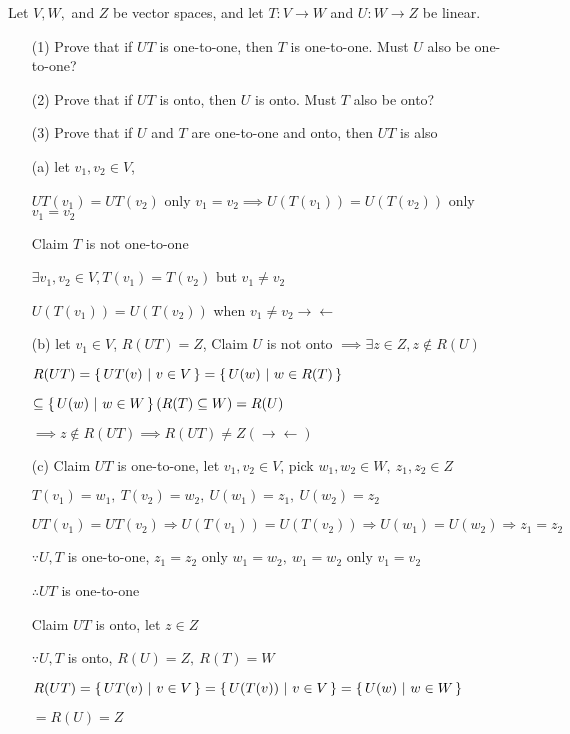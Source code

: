 Let $V,W,$ and $Z$ be vector spaces, and let $T:V \rightarrow W$ and $U:W \rightarrow Z$ be linear.

\begin{enumerate}
	\item[(1)] Prove that if $UT$ is one-to-one, then $T$ is one-to-one. Must $U$ also be one-to-one?
	\item[(2)] Prove that if $UT$ is onto, then $U$ is onto. Must $T$ also be onto?
	\item[(3)] Prove that if $U$ and $T$ are one-to-one and onto, then $UT$ is also
\end{enumerate}

\begin{tcolorbox}
	\begin{enumerate}
		\item[(a)] let $v_1,v_2 \in V$,
		
		$UT(v_1) = UT(v_2)$ only $v_1 = v_2 \implies U(T(v_1)) = U(T(v_2))$ only $v_1 = v_2$
		
		Claim $T$ is not one-to-one
		
		$\exists v_1,v_2 \in V, T(v_1) = T(v_2)$ but $v_1 \neq v_2$
		
		$U(T(v_1)) = U(T(v_2))$ when $v_1 \neq v_2 \rightarrow\leftarrow$
		
		\item[(b)] let $v_1 \in V$, $R(UT)=Z$, Claim $U$ is not onto $\implies \exists z \in Z, z \notin R(U)$
		
		$R(UT) = \left\{ \,UT(v)~|~v \in V \,\right\} = \left\{ \,U(w)~|~w\in R(T) \,\right\} $
		
		$\subseteq \left\{ \,U(w)~|~w \in W \,\right\}(R(T) \subseteq W) = R(U)$
		
		$\implies z \notin R(UT) \implies R(UT) \neq Z (\rightarrow\leftarrow)$
		
		\item[(c)] Claim $UT$ is one-to-one, let $v_1,v_2 \in V$, pick $w_1,w_2 \in W,~z_1,z_2 \in Z$
		
		$ T(v_1)=w_1,~T(v_2)=w_2,~U(w_1)=z_1,~U(w_2)=z_2$
		
		$UT(v_1)=UT(v_2) \Rightarrow U(T(v_1))=U(T(v_2)) \Rightarrow U(w_1) = U(w_2)\Rightarrow z_1=z_2$
		
		$\because U,T$ is one-to-one, $z_1=z_2$ only $w_1=w_2,~w_1=w_2$ only $v_1 = v_2$
		
		$\therefore UT$ is one-to-one
		
		Claim $UT$ is onto, let $z \in Z$
		
		$\because U,T$ is onto, $R(U) = Z,~R(T)=W$
		
		$R(UT) = \left\{ \,UT(v)~|~v \in V \,\right\} = \left\{ \,U(T(v))~|~v\in V \,\right\} = \left\{ \,U(w)~|~w \in W \,\right\} $
		
		$= R(U) = Z$		
	\end{enumerate}
\end{tcolorbox}